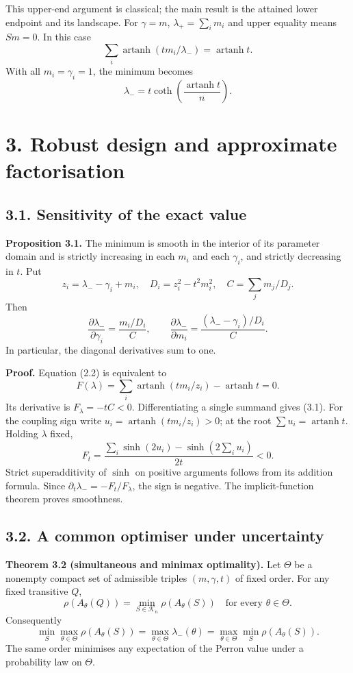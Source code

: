 \documentclass[
  11pt,
  a4paper,
]{article}
\begin{document}
This upper-end argument is classical; the main result is the attained
lower endpoint and its landscape. For \(\gamma=m\),
\(\lambda_+=\sum_i m_i\) and upper equality means \(Sm=0\). In this case
\[\sum_i\operatorname{artanh}(tm_i/\lambda_-)=\operatorname{artanh}t.\]
With all \(m_i=\gamma_i=1\), the minimum becomes
\[\lambda_-=t\coth\!\left(\frac{\operatorname{artanh}t}{n}\right). \tag{2.9}\]

\section{3. Robust design and approximate
factorisation}\label{robust-design-and-approximate-factorisation}

\subsection{3.1. Sensitivity of the exact
value}\label{sensitivity-of-the-exact-value}

\textbf{Proposition 3.1.} The minimum is smooth in the interior of its
parameter domain and is strictly increasing in each \(m_i\) and each
\(\gamma_i\), and strictly decreasing in \(t\). Put
\[z_i=\lambda_--\gamma_i+m_i,\quad D_i=z_i^2-t^2m_i^2,\quad C=\sum_jm_j/D_j.\]
Then \[
 \frac{\partial\lambda_-}{\partial\gamma_i}=
 \frac{m_i/D_i}{C},\qquad
 \frac{\partial\lambda_-}{\partial m_i}=
 \frac{(\lambda_--\gamma_i)/D_i}{C}.                          \tag{3.1}
\] In particular, the diagonal derivatives sum to one.

\textbf{Proof.} Equation (2.2) is equivalent to
\[F(\lambda)=\sum_i\operatorname{artanh}(tm_i/z_i)-\operatorname{artanh}t=0.\]
Its derivative is \(F_\lambda=-tC<0\). Differentiating a single summand
gives (3.1). For the coupling sign write
\(u_i=\operatorname{artanh}(tm_i/z_i)>0\); at the root
\(\sum u_i=\operatorname{artanh}t\). Holding \(\lambda\) fixed,
\[F_t=\frac{\sum_i\sinh(2u_i)-\sinh(2\sum_i u_i)}{2t}<0.\] Strict
superadditivity of \(\sinh\) on positive arguments follows from its
addition formula. Since \(\partial_t\lambda_-=-F_t/F_\lambda\), the sign
is negative. The implicit-function theorem proves smoothness.

\subsection{3.2. A common optimiser under
uncertainty}\label{a-common-optimiser-under-uncertainty}

\textbf{Theorem 3.2 (simultaneous and minimax optimality).} Let
\(\Theta\) be a nonempty compact set of admissible triples
\((m,\gamma,t)\) of fixed order. For any fixed transitive \(Q\), \[
 \rho(A_\theta(Q))=\min_{S\in\mathcal K_n}\rho(A_\theta(S))
 \quad\text{for every }\theta\in\Theta.
\] Consequently \[
 \min_S\max_{\theta\in\Theta}\rho(A_\theta(S))
 =\max_{\theta\in\Theta}\lambda_-(\theta)
 =\max_{\theta\in\Theta}\min_S\rho(A_\theta(S)).              \tag{3.2}
\] The same order minimises any expectation of the Perron value under a
probability law on \(\Theta\).
\end{document}
